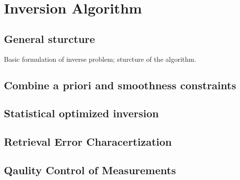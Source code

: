 \chapter{Inversion Algorithm}

\section{General sturcture}

Basic formulation of inverse problem; sturcture of the algorithm.

\section{Combine a priori and smoothness constraints}

\section{Statistical optimized inversion}

\section{Retrieval Error Characertization}

\section{Qaulity Control of Measurements}


